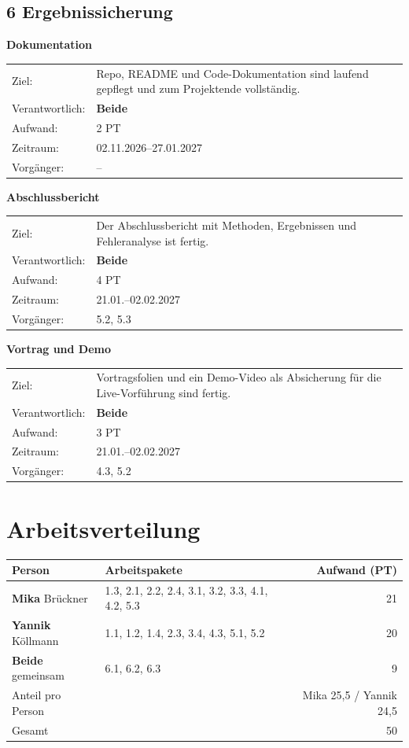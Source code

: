 \documentclass[11pt,a4paper]{article}
\makeatletter
\newcommand{\mika}{\textcolor{mika}{\textbf{Mika}}}
\newcommand{\yannik}{\textcolor{yannik}{\textbf{Yannik}}}
\newcommand{\beide}{\textcolor{beide}{\textbf{Beide}}}
\newcommand{\ap}[7]{%
  \item[\textbf{#1}] \textbf{#2}\par
  \begin{tabularx}{\linewidth}{@{}l X@{}}
    Ziel: & #7 \\
    Verantwortlich: & #3 \\
    Aufwand: & #4 PT \\
    Zeitraum: & #5 \\
    Vorgänger: & #6 \\
  \end{tabularx}
  \vspace{0.3em}
}
\makeatother
\begin{document}
\subsection*{6 Ergebnissicherung}
\begin{description}[leftmargin=2.2em, labelwidth=2em, itemsep=0.4em]
  \ap{6.1}{Dokumentation}{\beide}{2}{02.11.2026--27.01.2027}{--}
     {Repo, README und Code-Dokumentation sind laufend gepflegt und zum Projektende
      vollständig.}
  \ap{6.2}{Abschlussbericht}{\beide}{4}{21.01.--02.02.2027}{5.2, 5.3}
     {Der Abschlussbericht mit Methoden, Ergebnissen und Fehleranalyse ist fertig.}
  \ap{6.3}{Vortrag und Demo}{\beide}{3}{21.01.--02.02.2027}{4.3, 5.2}
     {Vortragsfolien und ein Demo-Video als Absicherung für die Live-Vorführung sind
      fertig.}
\end{description}

\section{Arbeitsverteilung}

\begin{center}
\begin{tabular}{@{}llr@{}}
  \toprule
  Person & Arbeitspakete & Aufwand (PT) \\
  \midrule
  \mika{} Brückner & 1.3, 2.1, 2.2, 2.4, 3.1, 3.2, 3.3, 4.1, 4.2, 5.3 & 21 \\
  \yannik{} Köllmann & 1.1, 1.2, 1.4, 2.3, 3.4, 4.3, 5.1, 5.2 & 20 \\
  \beide{} gemeinsam & 6.1, 6.2, 6.3 & 9 \\
  \midrule
  Anteil pro Person & & Mika 25,5 / Yannik 24,5 \\
  \midrule
  Gesamt & & 50 \\
  \bottomrule
\end{tabular}
\end{center}
\end{document}
